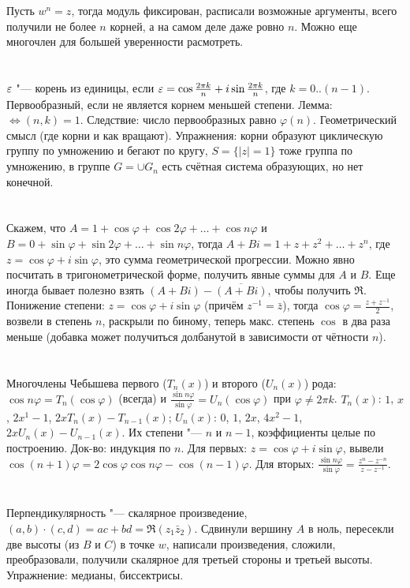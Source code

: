 \section{} %
Пусть $w^n = z$, тогда модуль фиксирован, расписали возможные аргументы, всего получили не более $n$ корней, а на самом деле даже ровно $n$.
Можно еще многочлен для большей уверенности расмотреть.

\section{} %
$\varepsilon$ "--- корень из единицы, если $\varepsilon = \cos\frac{2\pi k}{n} + i\sin\frac{2\pi k}{n}$, где $k=0..(n-1)$. Первообразный, если
не является корнем меньшей степени. Лемма: $\iff (n,k)=1$. Следствие: число первообразных равно $\varphi(n)$. Геометрический смысл
(где корни и как вращают). Упражнения: корни образуют циклическую группу по умножению и бегают по кругу, $S=\{|z|=1\}$ тоже группа по умножению, в группе $G=\cup G_n$
есть счётная система образующих, но нет конечной.

\section{} %
Скажем, что $A = 1 + \cos\varphi + \cos2\varphi + \dots + \cos n\varphi$ и $B=0+\sin\varphi + \sin2\varphi + \dots + \sin n\varphi$,
тогда $A+Bi = 1+z+z^2+\dots+z^n$, где $z=\cos\varphi + i\sin\varphi$, это сумма геометрической прогрессии. Можно явно посчитать в тригонометрической
форме, получить явные суммы для $A$ и $B$. Еще иногда бывает полезно взять $(A+Bi)-\overline{(A+Bi)}$, чтобы получить $\Re$.
Понижение степени: $z=\cos\varphi + i\sin\varphi$ (причём $z^{-1}=\bar z$), тогда $\cos\varphi=\frac{z+z^{-1}}{2}$, возвели в степень $n$,
раскрыли по биному, теперь макс. степень $\cos$ в два раза меньше (добавка может получиться долбанутой в зависимости от чётности $n$).

\section{} %
Многочлены Чебышева первого ($T_n(x)$) и второго ($U_n(x)$) рода: $\cos n\varphi = T_n(\cos\varphi)$ (всегда) и $\frac{\sin n\varphi}{\sin\varphi} = U_n(\cos\varphi)$ при $\varphi \neq 2\pi k$.
$T_n(x)$: $1$, $x$, $2x^1-1$, $2xT_n(x)-T_{n-1}(x)$; $U_n(x)$: $0$, $1$, $2x$, $4x^2-1$, $2xU_n(x)-U_{n-1}(x)$. Их степени "--- $n$ и $n-1$, коэффициенты целые по построению.
Док-во: индукция по $n$. Для первых: $z=\cos\varphi + i\sin\varphi$, вывели $\cos (n+1)\varphi = 2\cos\varphi \cos n\varphi - \cos(n-1)\varphi$. Для вторых:
$\frac{\sin n\varphi}{\sin \varphi} = \frac{z^n-z^{-n}}{z-z^{-1}}$.

\section{} %
Перпендикулярность "--- скалярное произведение, $(a, b) \cdot (c, d) = ac + bd = \Re(z_1\bar z_2)$. Сдвинули вершину $A$ в ноль,
пересекли две высоты (из $B$ и $C$) в точке $w$, написали произведения, сложили, преобразовали, получили скалярное для третьей стороны
и третьей высоты. Упражнение: медианы, биссектрисы.
